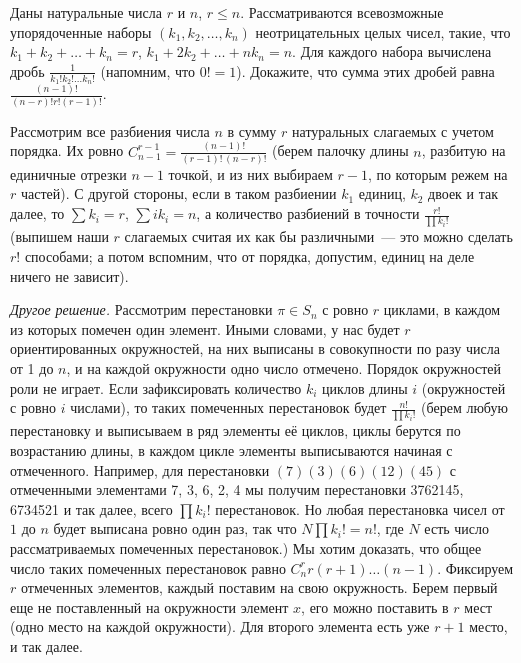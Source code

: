 Даны натуральные числа $r$ и $n$, $r \leq n$.
Рассматриваются всевозможные упорядоченные наборы $(k_1, k_2, \ldots, k_n)$
неотрицательных целых чисел, такие, что
$k_1 + k_2 + \ldots + k_n = r$, $k_1 + 2 k_2 + \ldots + n k_n = n$.
Для каждого набора вычислена дробь $\frac{1}{k_1! k_2! \ldots k_n!}$
(напомним, что $0! = 1$).
Докажите, что сумма этих дробей равна
\(
    \frac{(n - 1)!}{(n - r)! r! (r - 1)!}
\).

\solution
Рассмотрим все разбиения числа $n$ в сумму $r$ натуральных слагаемых с учетом
порядка.
Их ровно
$C_{n - 1}^{r - 1} = \frac{(n - 1)!}{(r - 1)! \, (n - r)!}$
(берем палочку длины $n$, разбитую на единичные отрезки $n - 1$ точкой, и из
них выбираем $r - 1$, по которым режем на $r$ частей).
С другой стороны, если в таком разбиении $k_1$ единиц, $k_2$ двоек и так далее,
то $\sum k_i = r$, $\sum i k_i = n$, а количество разбиений в точности
$\frac{r!}{\prod k_i!}$
(выпишем наши $r$ слагаемых считая их как бы различными~--- это можно сделать
$r!$ способами;
а потом вспомним, что от порядка, допустим, единиц на деле ничего не зависит).
\par
\emph{Другое решение.}
Рассмотрим перестановки $\pi \in S_n$ с ровно $r$ циклами, в каждом из которых
помечен один элемент.
Иными словами, у нас будет $r$ ориентированных окружностей, на них выписаны в
совокупности по разу числа от 1 до $n$, и на каждой окружности одно число
отмечено.
Порядок окружностей роли не играет.
Если зафиксировать количество $k_i$ циклов длины $i$
(окружностей с ровно $i$ числами), то таких помеченных перестановок будет
$\frac{n!}{\prod k_i!}$
(берем любую перестановку и выписываем в ряд элементы её циклов, циклы берутся
по возрастанию длины, в каждом цикле элементы выписываются начиная с
отмеченного.
Например, для перестановки $(7) (3) (6) (1 2) (4 5)$ с отмеченными элементами
7, 3, 6, 2, 4 мы получим перестановки 3762145, 6734521 и так далее, всего
$\prod k_i!$ перестановок.
Но любая перестановка чисел от $1$ до $n$ будет выписана ровно один раз, так
что $N \prod k_i! = n!$, где $N$ есть число рассматриваемых помеченных
перестановок.)
Мы хотим доказать, что общее число таких помеченных перестановок равно
$C_n^{r} r (r + 1) \ldots (n - 1)$.
Фиксируем $r$ отмеченных элементов, каждый поставим на свою окружность.
Берем первый еще не поставленный на окружности элемент $x$, его можно поставить
в $r$ мест (одно место на каждой окружности).
Для второго элемента есть уже $r + 1$ место, и так далее.

